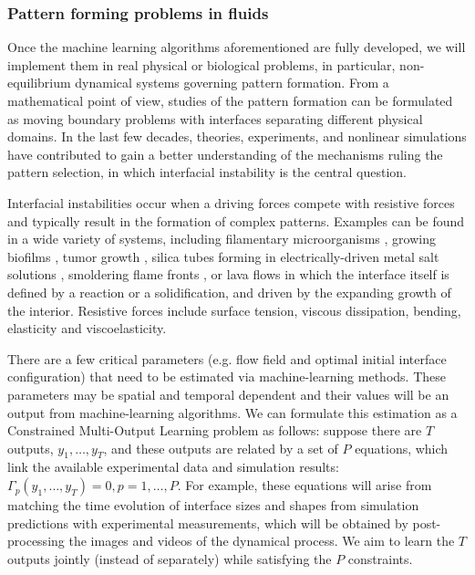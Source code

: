 \subsubsection{Pattern forming problems in fluids}
Once the machine learning algorithms aforementioned are fully developed, we will implement them in real physical or biological problems, in particular, non-equilibrium dynamical systems governing pattern formation.  From
a mathematical point of view, studies of the pattern formation can be
formulated as moving boundary problems with interfaces separating
different physical  domains.  In the last few decades, theories,
experiments, and nonlinear simulations have contributed to gain a
better understanding of the mechanisms ruling the pattern selection,
in which interfacial instability is the central question. 

Interfacial instabilities occur when a driving forces compete with resistive forces and typically result in the formation of complex patterns. Examples can be found in a wide
variety of systems, including filamentary microorganisms \cite{alain},
growing biofilms \cite{dockery01,Mattei2018}, tumor growth  \cite{MJ2020,Kara2018}, silica tubes forming in electrically-driven metal salt solutions \cite{steinbock03,steinbock16}, smoldering flame fronts
\cite{zik98,Kagan2008}, or lava flows \cite{balmforth00, griffiths00,Roman2021} in which
the interface itself is defined by a reaction or a solidification, and
driven by the expanding growth of the interior. Resistive forces include surface tension, viscous dissipation, bending, elasticity and viscoelasticity.

There are a few critical parameters (e.g. flow field and optimal initial interface configuration) that need to be estimated via machine-learning methods. These parameters may be spatial and temporal dependent and their values will be an output from machine-learning algorithms. We can formulate this estimation as a Constrained Multi-Output Learning problem as follows: suppose there are $T$ outputs, $y_1, \ldots, y_T$, and these outputs are related by a set of  $P$ equations, which link the available experimental data and simulation results: $\Gamma_p(y_1, \ldots, y_T)=0, p=1, \ldots, P$. For example, these equations will arise from matching the time evolution of interface sizes and shapes  from simulation predictions with experimental measurements, which will be obtained by post-processing the images and videos of the  dynamical process. We aim to learn the $T$ outputs jointly (instead of separately) while satisfying the $P$ constraints. 

